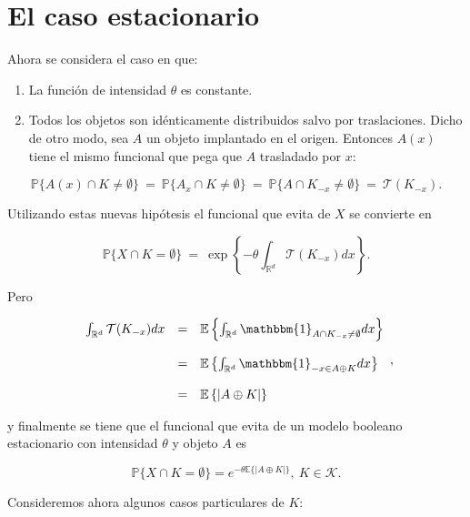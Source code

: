 \section{El caso estacionario}\label{casoest}

Ahora se considera el caso en que:

\begin{enumerate}
	\item La funci\'on de intensidad $\theta$ es constante.
\item Todos los objetos son id\'enticamente distribuidos salvo por traslaciones. Dicho de otro modo, sea $A$ un objeto implantado en el origen. Entonces $A(x)$ tiene el mismo funcional que pega que $A$ trasladado por $x$:
\end{enumerate}

\[\mathbb{P}\{A(x)\cap K\neq\emptyset\}\ =\ \mathbb{P}\{A_x\cap K\neq\emptyset\}\ =\ \mathbb{P}\{A\cap K_{-x}\neq\emptyset\}\ =\ \mathcal{T}(K_{-x}).\]

Utilizando estas nuevas hip\'otesis el funcional que evita de $X$ se convierte en

\[\mathbb{P}\{X\cap K=\emptyset\}\ =\ \exp\left\{-\theta\int_{\mathbb{R}^d}\mathcal{T}(K_{-x})dx\right\}.\]

Pero

\[\begin{array}{ccl}
\int_{\mathbb{R}^d}\mathcal{T}(K_{-x})dx&=&\mathbb{E}\left\{\int_{\mathbb{R}^d}\mathbbm{1}_{A\cap K_{-x}\neq\emptyset}dx\right\}\\
&&\\
&=&\mathbb{E}\left\{\int_{\mathbb{R}^d}\mathbbm{1}_{-x\in A\oplus K}dx\right\}\\
&&\\
&=&\mathbb{E}\left\{|A\oplus K|\right\}
\end{array},\]

y finalmente se tiene que el funcional que evita de un modelo booleano estacionario con intensidad $\theta$ y objeto $A$ es

\[\mathbb{P}\{X\cap K=\emptyset\}=e^{-\theta\mathbb{E}\{|A\oplus K|\}},\ K\in\mathcal{K}.\]

Consideremos ahora algunos casos particulares de $K$:

